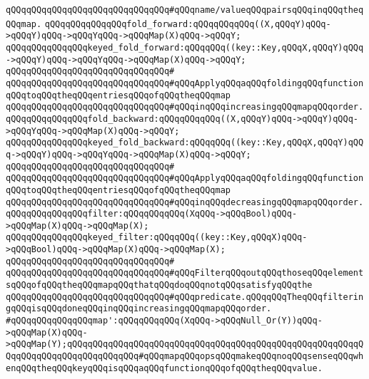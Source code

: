 \verb|qQQqqQQqqQQqqQQqqQQqqQQqqQQqqQQq#qQQqname/valueqQQqpairsqQQqinqQQqtheqQQqmap.|\newline
\newline
\verb|qQQqqQQqqQQqqQQqfold_forward:qQQqqQQqqQQq((X,qQQqY)qQQq->qQQqY)qQQq->qQQqYqQQq->qQQqMap(X)qQQq->qQQqY;|\newline
\verb|qQQqqQQqqQQqqQQqkeyed_fold_forward:qQQqqQQq((key::Key,qQQqX,qQQqY)qQQq->qQQqY)qQQq->qQQqYqQQq->qQQqMap(X)qQQq->qQQqY;|\newline
\verb|qQQqqQQqqQQqqQQqqQQqqQQqqQQqqQQq#|\newline
\verb|qQQqqQQqqQQqqQQqqQQqqQQqqQQqqQQq#qQQqApplyqQQqaqQQqfoldingqQQqfunctionqQQqtoqQQqtheqQQqentriesqQQqofqQQqtheqQQqmap|\newline
\verb|qQQqqQQqqQQqqQQqqQQqqQQqqQQqqQQq#qQQqinqQQqincreasingqQQqmapqQQqorder.|\newline
\newline
\verb|qQQqqQQqqQQqqQQqfold_backward:qQQqqQQqqQQq((X,qQQqY)qQQq->qQQqY)qQQq->qQQqYqQQq->qQQqMap(X)qQQq->qQQqY;|\newline
\verb|qQQqqQQqqQQqqQQqkeyed_fold_backward:qQQqqQQq((key::Key,qQQqX,qQQqY)qQQq->qQQqY)qQQq->qQQqYqQQq->qQQqMap(X)qQQq->qQQqY;|\newline
\verb|qQQqqQQqqQQqqQQqqQQqqQQqqQQqqQQq#|\newline
\verb|qQQqqQQqqQQqqQQqqQQqqQQqqQQqqQQq#qQQqApplyqQQqaqQQqfoldingqQQqfunctionqQQqtoqQQqtheqQQqentriesqQQqofqQQqtheqQQqmap|\newline
\verb|qQQqqQQqqQQqqQQqqQQqqQQqqQQqqQQq#qQQqinqQQqdecreasingqQQqmapqQQqorder.|\newline
\newline
\verb|qQQqqQQqqQQqqQQqfilter:qQQqqQQqqQQq(XqQQq->qQQqBool)qQQq->qQQqMap(X)qQQq->qQQqMap(X);|\newline
\verb|qQQqqQQqqQQqqQQqkeyed_filter:qQQqqQQq((key::Key,qQQqX)qQQq->qQQqBool)qQQq->qQQqMap(X)qQQq->qQQqMap(X);|\newline
\verb|qQQqqQQqqQQqqQQqqQQqqQQqqQQqqQQq#|\newline
\verb|qQQqqQQqqQQqqQQqqQQqqQQqqQQqqQQq#qQQqFilterqQQqoutqQQqthoseqQQqelementsqQQqofqQQqtheqQQqmapqQQqthatqQQqdoqQQqnotqQQqsatisfyqQQqthe|\newline
\verb|qQQqqQQqqQQqqQQqqQQqqQQqqQQqqQQq#qQQqpredicate.qQQqqQQqTheqQQqfilteringqQQqisqQQqdoneqQQqinqQQqincreasingqQQqmapqQQqorder.|\newline
\newline
\verb|#qQQqqQQqqQQqqQQqmap':qQQqqQQqqQQq(XqQQq->qQQqNull_Or(Y))qQQq->qQQqMap(X)qQQq->qQQqMap(Y);qQQqqQQqqQQqqQQqqQQqqQQqqQQqqQQqqQQqqQQqqQQqqQQqqQQqqQQqqQQqqQQqqQQqqQQqqQQqqQQqqQQq#qQQqmapqQQqopsqQQqmakeqQQqnoqQQqsenseqQQqwhenqQQqtheqQQqkeyqQQqisqQQqaqQQqfunctionqQQqofqQQqtheqQQqvalue.|\newline
